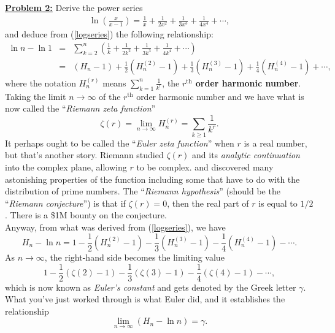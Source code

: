 \documentclass[10pt, AMS Euler]{article}
\newcommand{\ds}{\displaystyle}
\begin{document}
        



	
	\noindent\underline{{\bf Problem 2:}} Derive the power series 
	\begin{eqnarray}\ln\left(\frac{x}{x-1}\right) = \frac{1}{x} + \frac{1}{2x^2}+\frac{1}{3x^3} + \frac{1}{4x^4} + \cdots, \label{logseries}\end{eqnarray}
	and deduce from (\ref{logseries}) the following relationship:
	\begin{eqnarray*} \ln{n} - \ln{1} & = & \sum_{k =2}^n \left(\frac{1}{k} + \frac{1}{2k^2} + \frac{1}{3k^3} + \frac{1}{4k^4} + \cdots  \right) \\
		& = & \left(H_n - 1 \right) + \frac{1}{2}\left(H_n^{(2)} - 1 \right) + \frac{1}{3}\left(H_n^{(3)} -1 \right) + \frac{1}{4}\left(H_n^{(4)} -1\right) + \cdots,
	\end{eqnarray*}
	where the notation $H_n^{(r)}$ means $\ds \sum_{k = 1}^n \frac{1}{k^r}$, the {\bf $r^{\mbox{th}}$ order harmonic number}. \\
	
	
	 Taking the limit $n \to \infty$ of the $r^{\mbox{th}}$ order harmonic number and we have what is now called the ``\emph{Riemann zeta function}'' 
	$$\zeta(r)  = \lim_{n \to \infty} H_n^{(r)} = \sum_{k \geq 1}\frac{1}{k^r}.$$
	It perhaps ought to be called the ``\emph{Euler zeta function}'' when $r$ is a real number, but that's another story. 
	Riemann studied $\zeta(r)$ and its \emph{analytic continuation} into the complex plane, allowing $r$ to be complex. and discovered many astonishing properties of the function including some that have to do with the distribution of prime numbers.  
	The ``\emph{Riemann hypothesis}'' (should be the ``\emph{Riemann conjecture}'') is that if $\zeta(r) = 0$, then the real part of $r$ is equal to $1/2$. 
	There is a \$1M bounty on the conjecture. \\ 
	
	Anyway, from what was derived from (\ref{logseries}), we have 
	$$H_n - \ln{n} = 1 - \frac{1}{2}\left(H_n^{(2)} - 1 \right) - \frac{1}{3}\left(H_n^{(3)} -1 \right) - \frac{1}{4}\left(H_n^{(4)} -1\right) - \cdots.$$
	As $n \to \infty$, the right-hand side becomes the limiting value 
	$$1 - \frac{1}{2}\left(\zeta(2) - 1 \right) - \frac{1}{3}\left(\zeta(3) -1 \right) - \frac{1}{4}\left(\zeta(4) -1\right) - \cdots,$$
	which is now known as \emph{Euler's constant} and gets denoted by the Greek letter $\gamma$. 
	What you've just worked through is what Euler did, and it establishes the relationship 
	$$\lim_{n \to \infty}\left(H_n - \ln{n}\right) = \gamma.$$
\end{document}
